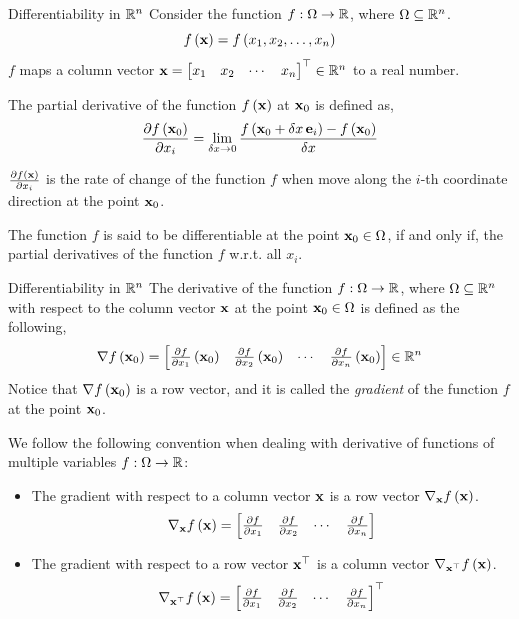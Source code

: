 \documentclass[aspectratio=169]{beamer}
\let\olditem\item
\renewcommand{\item}{\setlength{\itemsep}{\fill}\olditem}
\def\mf{\ensuremath\mathbf}
\def\mb{\ensuremath\mathbb}
\def\lp{\ensuremath\left(}
\def\rp{\ensuremath\right)}
\def\bmx{\ensuremath\begin{bmatrix*}[r]}
\def\emx{\ensuremath\end{bmatrix*}}
\def\R{\ensuremath\mb{R}}
\newcommand{\ct}[1]{\lp #1\rp}
\begin{document}
\begin{frame}[t]{Differentiability in $\R^n$}
  Consider the function $f: \Omega \to \R$, where $\Omega \subseteq \R^n$.
  \[ f\ct{\mf{x}} = f\ct{x_1, x_2, \ldots, x_n} \]
  $f$ maps a column vector $\mf{x} = \bmx x_1 & x_2 & \cdots & x_n \emx^\top \in \mb{R}^n$ to a real number.
  \vspace{0.25cm}

  The partial derivative of the function $f\ct{\mf{x}}$ at $\mf{x}_0$ is defined as,
  \[ \frac{\partial f\ct{\mf{x}_0}}{\partial x_i} = \lim_{\delta x \to 0} \frac{f\ct{\mf{x}_0 + \delta x \, \mf{e}_i} - f\ct{\mf{x}_0}}{\delta x} \]

  $\frac{\partial f\ct{\mf{x}}}{\partial x_i}$ is the rate of change of the function $f$ when move along the $i$-th coordinate direction at the point $\mf{x}_0$.
  \vspace{0.25cm}
  
  The function $f$ is said to be differentiable at the point $\mf{x}_0 \in \Omega$, if and only if, the partial derivatives of the function $f$ w.r.t. all $x_i$.
\end{frame}


\begin{frame}[t]{Differentiability in $\R^n$}
  The derivative of the function $f: \Omega \to \R$, where $\Omega \subseteq \R^n$ with respect to the column vector $\mf{x}$ at the point $\mf{x}_0 \in \Omega$ is defined as the following,
  \[ \nabla f\ct{\mf{x}_0} = \bmx \frac{\partial f}{\partial x_1}\ct{\mf{x}_0} & \frac{\partial f}{\partial x_2}\ct{\mf{x}_0} & \cdots & \frac{\partial f}{\partial x_n}\ct{\mf{x}_0}\emx \in \mb{R}^n \]
  Notice that $\nabla f\ct{\mf{x}_0}$ is a row vector, and it is called the \textit{gradient} of the function $f$ at the point $\mf{x}_0$.

  We follow the following convention when dealing with derivative of functions of multiple variables $f: \Omega \to \R$:
  \begin{itemize}
    \item The gradient with respect to a column vector $\mf{x}$ is a row vector $\nabla_{\mf{x}} f\ct{\mf{x}}$.
    \[ \nabla_{\mf{x}} f\ct{\mf{x}} = \bmx \frac{\partial f}{\partial x_1} & \frac{\partial f}{\partial x_2} & \cdots & \frac{\partial f}{\partial x_n} \emx \]
    \item The gradient with respect to a row vector $\mf{x}^\top$ is a column vector $\nabla_{\mf{x}^\top} f\ct{\mf{x}}$.
    \[ \nabla_{\mf{x}^\top} f\ct{\mf{x}} = \bmx \frac{\partial f}{\partial x_1} & \frac{\partial f}{\partial x_2} & \cdots & \frac{\partial f}{\partial x_n} \emx^\top \]
  \end{itemize}
\end{frame}
\end{document}
